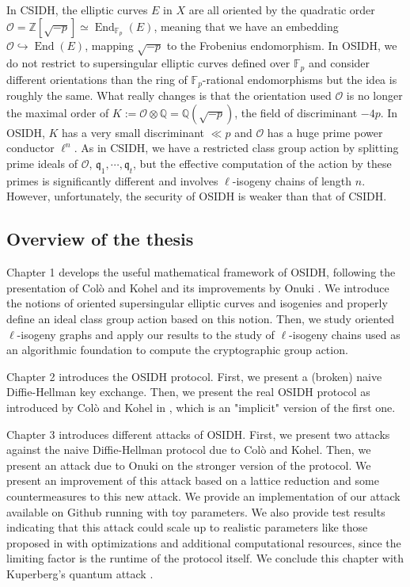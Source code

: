 \documentclass[a4paper,10pt]{report}
\theoremstyle{definition}
\theoremstyle{plain}
\theoremstyle{definition}
\newcommand{\Z}{\mathbb{Z}}
\newcommand{\Q}{\mathbb{Q}}
\newcommand{\F}{\mathbb{F}}
\newcommand{\mO}{\mathcal{O}}
\renewcommand{\(}{\left(}
\renewcommand{\)}{\right)}
\newcommand{\mf}[1]{\mathfrak{#1}}
\DeclareMathOperator{\End}{End}
\begin{document}
In CSIDH, the elliptic curves $E$ in $X$ are all oriented by the quadratic order $\mO=\Z[\sqrt{-p}]\simeq\End_{\F_p}(E)$, meaning that we have an embedding $\mO\hookrightarrow \End(E)$, mapping $\sqrt{-p}$ to the Frobenius endomorphism.  In OSIDH, we do not restrict to supersingular elliptic curves defined over $\F_p$ and consider different orientations than the ring of $\F_p$-rational endomorphisms but the idea is roughly the same. What really changes is that the orientation used $\mO$ is no longer the maximal order of $K:=\mO\otimes\Q=\Q(\sqrt{-p})$, the field of discriminant $-4p$. In OSIDH, $K$ has a very small discriminant $\ll p$ and $\mO$ has a huge prime power conductor $\ell^n$. As in CSIDH, we have a restricted class group action by splitting prime ideals of $\mO$, $\mf{q}_1, \cdots, \mf{q}_t$, but the effective computation of the action by these primes is significantly different and involves $\ell$-isogeny chains of length $n$. However, unfortunately, the security of OSIDH is weaker than that of CSIDH.

\subsection*{Overview of the thesis}

Chapter 1 develops the useful mathematical framework of OSIDH, following the presentation of Col\`{o} and Kohel \cite{OSIDH} and its improvements by Onuki \cite{Onuki}. We introduce the notions of oriented supersingular elliptic curves and isogenies and properly define an ideal class group action based on this notion. Then, we study oriented $\ell$-isogeny graphs and apply our results to the study of $\ell$-isogeny chains used as an algorithmic foundation to compute the cryptographic group action.

Chapter 2 introduces the OSIDH protocol. First, we present a (broken) naive Diffie-Hellman key exchange. Then, we present the real OSIDH protocol as introduced by Col\`{o} and Kohel in \cite[§ 5.2]{OSIDH}, which is an "implicit" version of the first one.

Chapter 3 introduces different attacks of OSIDH. First, we present two attacks against the naive Diffie-Hellman protocol due to Col\`{o} and Kohel.  Then, we present an attack due to Onuki \cite[§ 6.3]{Onuki} on the stronger version of the protocol. We present an improvement of this attack based on a lattice reduction and some countermeasures to this new attack. We provide an implementation of our attack available on Github \cite{MyGithub} running with toy parameters. We also provide test results indicating that this attack could scale up to realistic parameters like those proposed in \cite[p.434]{OSIDH} with optimizations and additional computational resources, since the limiting factor is the runtime of the protocol itself. We conclude this chapter with Kuperberg's quantum attack \cite{Kuperberg}.
\end{document}
